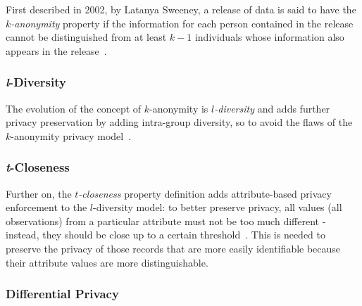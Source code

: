 First described in 2002, by Latanya Sweeney, a release of data is said to have the \textit{$k$-anonymity} property if the information for each person contained in the release cannot be distinguished from at least $k-1$ individuals whose information also appears in the release~\citep{Sweeney:kAnonymity}.

\subsubsection{\textit{l}-Diversity}

The evolution of the concept of $k$-anonymity is \textit{$l$-diversity} and adds further privacy preservation by adding intra-group diversity, so to avoid the flaws of the $k$-anonymity privacy model~\citep{Machanavajjhala:lDiversity}.

\subsubsection{\textit{t}-Closeness}

Further on, the \textit{$t$-closeness} property definition adds attribute-based privacy enforcement to the $l$-diversity model: to better preserve privacy, all values (all observations) from a particular attribute must not be too much different - instead, they should be close up to a certain threshold~\citep{Ninghui:tCloseness}. This is needed to preserve the privacy of those records that are more easily identifiable because their attribute values are more distinguishable.

\subsubsection{Differential Privacy}


